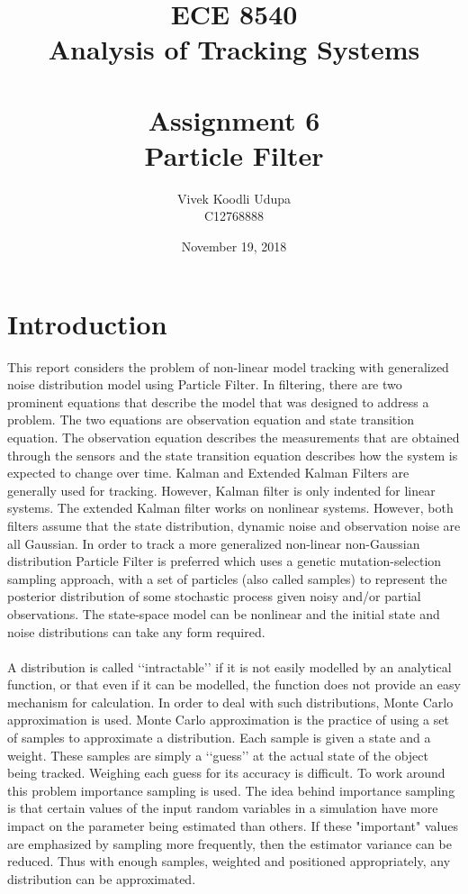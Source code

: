 \documentclass[12pt]{article}
\title{ECE 8540 \\ Analysis of Tracking Systems \\ \quad \\
	Assignment 6 \\ Particle Filter}
\author{Vivek Koodli Udupa \\ C12768888}
\date{November 19, 2018 }
\begin{document}
\begin{mdframed}
\maketitle
\end{mdframed}


\section{Introduction}
This report considers the problem of non-linear model tracking with generalized noise distribution model using Particle Filter. In filtering, there are two prominent equations that describe the model that was designed to address a problem. The two equations are observation equation and state transition equation. The observation equation describes the measurements that are obtained through the sensors and the state transition equation describes how the system is expected to change over time. Kalman and Extended Kalman Filters are generally used for tracking. However, Kalman filter is only indented for linear systems. The extended Kalman filter works on nonlinear systems. However, both filters assume that the state distribution, dynamic noise and observation noise are all Gaussian. In order to track a more generalized non-linear non-Gaussian distribution Particle Filter is preferred which uses a genetic mutation-selection sampling approach, with a set of particles (also called samples) to represent the posterior distribution of some stochastic process given noisy and/or partial observations. The state-space model can be nonlinear and the initial state and noise distributions can take any form required.\\ 
\\ \indent
A distribution is called \lq\lq{intractable}\rq\rq{} if it is not easily modelled by an analytical function, or that even if it can be modelled, the function does not provide an easy mechanism for calculation. In order to deal with such distributions, Monte Carlo approximation is used. Monte Carlo approximation is the practice of using a set of samples to approximate a distribution. Each sample is given a state and a weight. These samples are simply a \lq\lq{guess}\rq\rq{} at the actual state of the object being tracked. Weighing each guess for its accuracy is difficult. To work around this problem importance sampling is used. The idea behind importance sampling is that certain values of the input random variables in a simulation have more impact on the parameter being estimated than others. If these "important" values are emphasized by sampling more frequently, then the estimator variance can be reduced. Thus with enough samples, weighted and positioned appropriately, any distribution can be approximated.  \\ 
\end{document}
